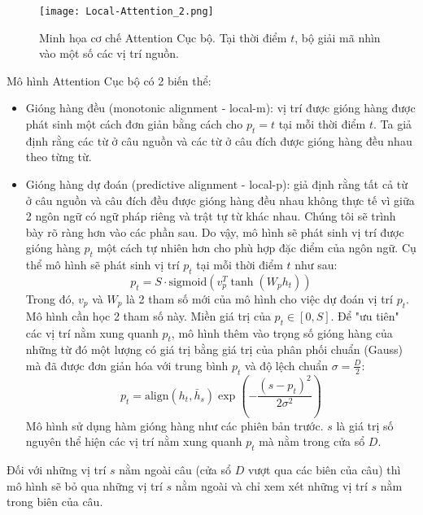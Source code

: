 \begin{figure}
	\centering
	\texttt{[image: Local-Attention\_2.png]}
	\caption[Minh họa cơ chế Attention Cục bộ.]{Minh họa cơ chế Attention Cục bộ. Tại thời điểm $t$, bộ giải mã nhìn vào một số các vị trí nguồn.}
	\label{fig_Local_Attention}
\end{figure}

Mô hình Attention Cục bộ có 2 biến thể:
\begin{itemize}
	\item Gióng hàng đều (monotonic alignment - local-m): vị trí được gióng hàng được phát sinh một cách đơn giản bằng cách cho $p_t = t$ tại mỗi thời điểm $t$. Ta giả định rằng các từ ở câu nguồn và các từ ở câu đích được gióng hàng đều nhau theo từng từ.
	\item Gióng hàng dự đoán (predictive alignment - local-p): giả định rằng tất cả từ ở câu nguồn và câu đích đều được gióng hàng đều nhau không thực tế vì giữa 2 ngôn ngữ có ngữ pháp riêng và trật tự từ khác nhau. Chúng tôi sẽ trình bày rõ ràng hơn vào các phần sau. Do vậy, mô hình sẽ phát sinh vị trí được gióng hàng $p_t$ một cách tự nhiên hơn cho phù hợp đặc điểm của ngôn ngữ. Cụ thể mô hình sẽ phát sinh vị trí $p_t$ tại mỗi thời điểm $t$ như sau:
	\begin{equation}
	p_t = S \cdot \text{sigmoid} (v^T_p \tanh(W_p h_t))
	\end{equation}
	Trong đó, $v_p$ và $W_p$ là 2 tham số mới của mô hình cho việc dự đoán vị trí $p_t$. Mô hình cần học 2 tham số này. Miền giá trị của $p_t \in [0, S]$.
	Để "ưu tiên" các vị trí nằm xung quanh $p_t$, mô hình thêm vào trọng số gióng hàng của những từ đó một lượng có giá trị bằng giá trị của phân phối chuẩn (Gauss) mà đã được đơn giản hóa với trung bình $p_t$ và độ lệch chuẩn $\sigma = \frac{D}{2}$:
	\begin{equation}
	p_t = \text{align}(h_t, \bar{h}_s)\exp\left(-\frac{(s-p_t)^2}{2\sigma^2}\right)
	\end{equation}
	Mô hình sử dụng hàm gióng hàng như các phiên bản trước. $s$ là giá trị số nguyên thể hiện các vị trí nằm xung quanh $p_t$ mà nằm trong cửa sổ $D$.
\end{itemize}
 Đối với những vị trí $s$ nằm ngoài câu (cửa sổ $D$ vượt qua các biên của câu) thì mô hình sẽ bỏ qua những vị trí $s$ nằm ngoài và chỉ xem xét những vị trí $s$ nằm trong biên của câu.
 
